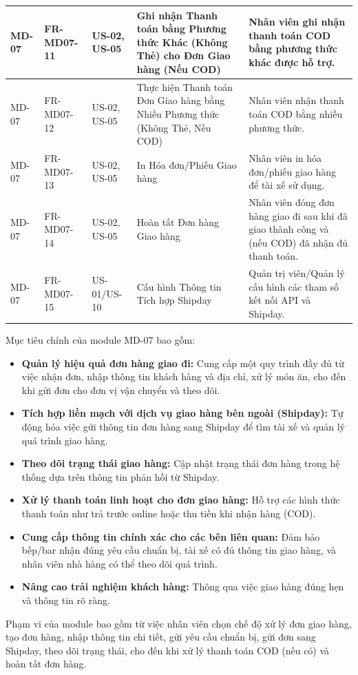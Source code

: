 \begin{longtable}{|m{2cm}|m{2.5cm}|m{2.5cm}|m{4.5cm}|m{4cm}|}
\hline
MD-07 & FR-MD07-11 & US-02, US-05 & Ghi nhận Thanh toán bằng Phương thức Khác (Không Thẻ) cho Đơn Giao hàng (Nếu COD) & Nhân viên ghi nhận thanh toán COD bằng phương thức khác được hỗ trợ. \\
\hline
MD-07 & FR-MD07-12 & US-02, US-05 & Thực hiện Thanh toán Đơn Giao hàng bằng Nhiều Phương thức (Không Thẻ, Nếu COD) & Nhân viên nhận thanh toán COD bằng nhiều phương thức. \\
\hline
MD-07 & FR-MD07-13 & US-02, US-05 & In Hóa đơn/Phiếu Giao hàng & Nhân viên in hóa đơn/phiếu giao hàng để tài xế sử dụng. \\
\hline
MD-07 & FR-MD07-14 & US-02, US-05 & Hoàn tất Đơn hàng Giao hàng & Nhân viên đóng đơn hàng giao đi sau khi đã giao thành công và (nếu COD) đã nhận đủ thanh toán. \\
\hline
MD-07 & FR-MD07-15 & US-01/US-10 & Cấu hình Thông tin Tích hợp Shipday & Quản trị viên/Quản lý cấu hình các tham số kết nối API và Shipday. \\
\hline

\end{longtable}


\label{sssec:md07_objectives_scope}
Mục tiêu chính của module MD-07 bao gồm:
\begin{itemize}
    \item \textbf{Quản lý hiệu quả đơn hàng giao đi:} Cung cấp một quy trình đầy đủ từ việc nhận đơn, nhập thông tin khách hàng và địa chỉ, xử lý món ăn, cho đến khi gửi đơn cho đơn vị vận chuyển và theo dõi.
    \item \textbf{Tích hợp liền mạch với dịch vụ giao hàng bên ngoài (Shipday):} Tự động hóa việc gửi thông tin đơn hàng sang Shipday để tìm tài xế và quản lý quá trình giao hàng.
    \item \textbf{Theo dõi trạng thái giao hàng:} Cập nhật trạng thái đơn hàng trong hệ thống dựa trên thông tin phản hồi từ Shipday.
    \item \textbf{Xử lý thanh toán linh hoạt cho đơn giao hàng:} Hỗ trợ các hình thức thanh toán như trả trước online hoặc thu tiền khi nhận hàng (COD).
    \item \textbf{Cung cấp thông tin chính xác cho các bên liên quan:} Đảm bảo bếp/bar nhận đúng yêu cầu chuẩn bị, tài xế có đủ thông tin giao hàng, và nhân viên nhà hàng có thể theo dõi quá trình.
    \item \textbf{Nâng cao trải nghiệm khách hàng:} Thông qua việc giao hàng đúng hẹn và thông tin rõ ràng.
\end{itemize}
Phạm vi của module bao gồm từ việc nhân viên chọn chế độ xử lý đơn giao hàng, tạo đơn hàng, nhập thông tin chi tiết, gửi yêu cầu chuẩn bị, gửi đơn sang Shipday, theo dõi trạng thái, cho đến khi xử lý thanh toán COD (nếu có) và hoàn tất đơn hàng.

